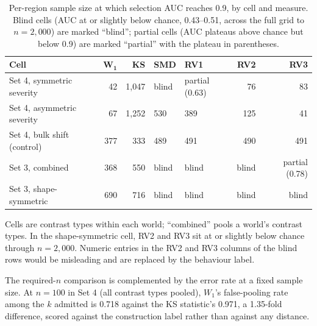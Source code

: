 \documentclass[AMA,Times1COL]{WileyNJDv5}
\begin{document}
\begin{table}[ht]
\centering
\caption{Per-region sample size at which selection AUC reaches 0.9, by cell and measure. Blind cells (AUC at or slightly below chance, 0.43--0.51, across the full grid to $n = 2{,}000$) are marked ``blind''; partial cells (AUC plateaus above chance but below 0.9) are marked ``partial'' with the plateau in parentheses.\label{tab:study2_required_n}}
\begin{tabular}{lrrllrr}
\toprule
\textbf{Cell} & $\boldsymbol{W_1}$ & \textbf{KS} & \textbf{SMD} & \textbf{RV1} & \textbf{RV2} & \textbf{RV3} \\
\midrule
Set 4, symmetric severity  & 42  & 1{,}047 & blind & partial (0.63) & 76  & 83 \\
Set 4, asymmetric severity & 67  & 1{,}252 & 530   & 389            & 125 & 41 \\
Set 4, bulk shift (control) & 377 & 333    & 489   & 491            & 490 & 491 \\
Set 3, combined            & 368 & 550     & blind & blind          & blind & partial (0.78) \\
Set 3, shape-symmetric     & 690 & 716     & blind & blind          & blind & blind \\
\bottomrule
\end{tabular}
\begin{tablenotes}
\item Cells are contrast types within each world; ``combined'' pools a world's contrast types. In the shape-symmetric cell, RV2 and RV3 sit at or slightly below chance through $n = 2{,}000$. Numeric entries in the RV2 and RV3 columns of the blind rows would be misleading and are replaced by the behaviour label.
\end{tablenotes}
\end{table}

The required-$n$ comparison is complemented by the error rate at a fixed sample size. At $n = 100$ in Set 4 (all contrast types pooled), $W_1$'s false-pooling rate among the $k$ admitted is 0.718 against the KS statistic's 0.971, a 1.35-fold difference, scored against the construction label rather than against any distance.
\end{document}

